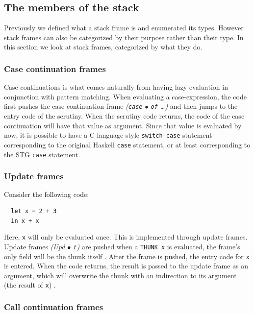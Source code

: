 \subsection{The members of the stack} \label{sec:members_of_stack}

Previously we defined what a stack frame is and enumerated
its types. However stack frames can also be categorized by
their purpose rather than their type. In this
section we look at stack frames, categorized by what they do.

\subsubsection{Case continuation frames}

Case continuations is what comes naturally from having lazy evaluation
in conjunction with pattern matching. When evaluating a case-expression, the code first
pushes the case continuation frame \emph{(\texttt{case} $\bullet$ \texttt{of}
\dots)} and then jumps to the entry code of the scrutiny. When the
scrutiny code returns, the code of the case continuation will have
that value as argument. Since that value is evaluated by now, it is
possible to have a C language style \texttt{switch-case} statement
corresponding to the original Haskell \texttt{case} statement,
or at least corresponding to the STG \texttt{case} statement.

\subsubsection{Update frames}

Consider the following code:

\begin{verbatim}
  let x = 2 + 3
  in x + x
\end{verbatim}

Here, \texttt{x} will only be evaluated once. This is implemented
through update frames. Update frames \emph{(Upd $\bullet$ \texttt{t})}
are pushed when a \texttt{THUNK \emph{x}} is evaluated, the frame's only
field will be the thunk itself \cite{github_thunk_code}. After the frame is
pushed, the entry code for \texttt{x} is entered. When the code returns,
the result is passed to the update frame as an argument, which will
overwrite the thunk with an indirection to its argument (the result of
\texttt{x}) \cite{github_updates_indirection}.


\subsubsection{Call continuation frames}

